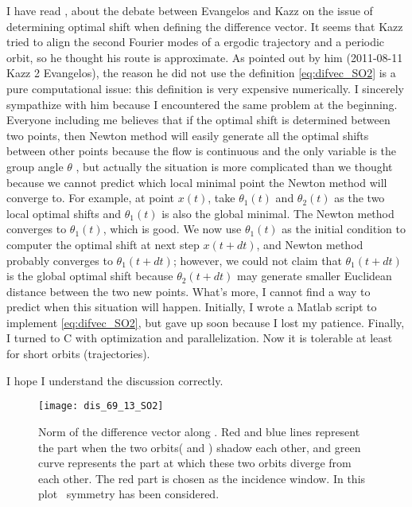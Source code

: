 \begin{description}
I have read , about the debate
between Evangelos and Kazz on the issue of determining
optimal shift when defining the difference vector.
It seems that Kazz tried to align the second Fourier
modes of a ergodic trajectory and a periodic orbit, so
he thought his route is approximate. As pointed out by him
(2011-08-11 Kazz 2 Evangelos), the reason he did not use the definition
\eqref{eq:difvec_SO2} is a pure computational issue: this definition
is very expensive numerically. I sincerely sympathize with him because
I encountered the same problem at the beginning.  Everyone including me
believes that if the optimal shift is determined between two points, then
Newton method will easily generate all the optimal shifts between other
points because the flow is continuous and the only variable is the group
angle $\theta$ , but actually the situation is
more complicated than we thought because we cannot predict which local
minimal point the Newton method will converge to. For example,
at point $x(t)$, take $\theta_1(t)$ and $\theta_2(t)$ as the two local
optimal shifts and $\theta_1(t)$
is also the global minimal. The Newton method converges
to $\theta_1(t)$, which is good. We now use $\theta_1(t)$ as the initial
condition to computer the optimal shift at next step $x(t+dt)$, and
Newton method probably converges to $\theta_{1}(t+dt)$; however, we could
not claim that $\theta_{1}(t+dt)$ is the global optimal shift because
$\theta_{2}(t+dt)$ may generate smaller Euclidean distance between the
two new points. What's more, I cannot find a way to predict when this
situation will happen. Initially, I wrote a Matlab script to implement
\eqref{eq:difvec_SO2}, but gave up soon because I lost my patience.
Finally, I turned to C with optimization and parallelization. Now it
is tolerable at least for short orbits (trajectories).

I hope I understand the  discussion correctly.

\begin{figure}[h]
  \centering
  \texttt{[image: dis\_69\_13\_SO2]}
  \caption{Norm of the difference vector along .
    Red and blue lines represent the part when the two
    orbits( and ) shadow each other,
    and green curve represents the part at which these two orbits diverge
    from each other. The red part is chosen as the incidence window.
    In this plot \ symmetry has been considered.
  }
  \label{fig:dis_69_13_SO2}
\end{figure}


\end{description}
